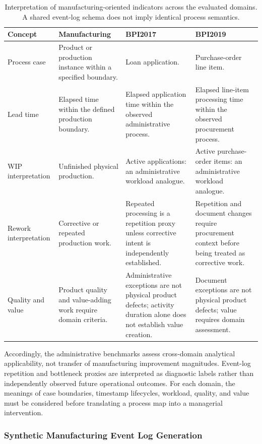 \documentclass[pdflatex,iicol,Numbered,sn-basic]{sn-jnl}
\begin{document}
\begin{table}[t]
\caption{Interpretation of manufacturing-oriented indicators across the evaluated domains. A shared event-log schema does not imply identical process semantics.}
\label{tab:domain_adaptation}
\centering\small
\begin{tabularx}{\textwidth}{p{2.1cm}XXX}
\toprule
\textbf{Concept} & \textbf{Manufacturing} & \textbf{BPI2017} & \textbf{BPI2019}\\
\midrule
Process case & Product or production instance within a specified boundary. & Loan application. & Purchase-order line item.\\
Lead time & Elapsed time within the defined production boundary. & Elapsed application time within the observed administrative process. & Elapsed line-item processing time within the observed procurement process.\\
WIP interpretation & Unfinished physical production. & Active applications: an administrative workload analogue. & Active purchase-order items: an administrative workload analogue.\\
Rework interpretation & Corrective or repeated production work. & Repeated processing is a repetition proxy unless corrective intent is independently established. & Repetition and document changes require procurement context before being treated as corrective work.\\
Quality and value & Product quality and value-adding work require domain criteria. & Administrative exceptions are not physical product defects; activity duration alone does not establish value creation. & Document exceptions are not physical product defects; value requires domain assessment.\\
\bottomrule
\end{tabularx}
\end{table}

Accordingly, the administrative benchmarks assess cross-domain analytical applicability, not transfer of manufacturing improvement magnitudes. Event-log repetition and bottleneck proxies are interpreted as diagnostic labels rather than independently observed future operational outcomes. For each domain, the meanings of case boundaries, timestamp lifecycles, workload, quality, and value must be considered before translating a process map into a managerial intervention.

\subsubsection{Synthetic Manufacturing Event Log Generation}
\end{document}
